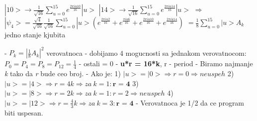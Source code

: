 \documentclass{article}
\begin{document}
\begin{tcolorbox}[width=\textwidth,colback={beaublue},outer arc=0mm,colupper=charcoal]
$|10> \longrightarrow \frac{1}{\sqrt{16}}\sum_{u=0}^{15}e^\frac{2\pi i u 10}{16}|u>$
\newline\hspace*{0.8cm}
$|14> \longrightarrow \frac{1}{\sqrt{16}}\sum_{u=0}^{15}e^\frac{2\pi i u 14}{16}|u>$
\vspace{0.2cm}\newline\hspace*{0.8cm} $\Rightarrow $
$|\psi_4> = \frac{\sqrt{4}}{\sqrt{16}}\frac{1}{\sqrt{16}}\sum_{u=0}^{15}|u>(e^\frac{2\pi i u 2}{16} + e^\frac{\pi i u 6}{16} + e^\frac{2\pi i u 10}{16} + e^\frac{2\pi i u 14}{16})$
\newline\hspace*{2.2cm}
$= \frac{1}{8}\sum_{u=0}^{15}|u>A_k$ jedno stanje kjubita 
\end{tcolorbox}

\begin{tcolorbox}[width=\textwidth,colback={beaublue},outer arc=0mm,colupper=charcoal]    
- $P_k = |\frac{1}{8}A_k|^2$ verovatnoca
\newline
- dobijamo 4 mogucnosti sa jednakom verovatnocom: \newline\hspace*{0.8cm}
$P_0 = P_4 = P_8 = P_{12} = \frac{1}{4}$
\newline
- ostali = 0
\newline
- \textbf{u*r = 16*k}, r - period
\newline
- Biramo najmanje \textit{k} tako da \textit{r} bude ceo broj.
\newline
- Ako je:
\newline\hspace*{0.4cm}
1) $|u> = |0> \Rightarrow r = 0 \Rightarrow neuspeh$
\newline\hspace*{0.4cm}
2) $|u> = |4> \Rightarrow r = 4k \Rightarrow za\ k = 1: \textbf{r = 4} $
\newline\hspace*{0.4cm}
3) $|u> = |8> \Rightarrow r = 2k \Rightarrow za\ k = 1: r = 2 \Rightarrow neuspeh$
\newline\hspace*{0.4cm}
4) $|u> = |12> \Rightarrow r = \frac{4}{3}k \Rightarrow za\ k = 3: \textbf{r = 4}$
\newline
- Verovatnoca je 1/2 da ce program biti uspesan.
\end{tcolorbox}
\newpage
\end{document}
